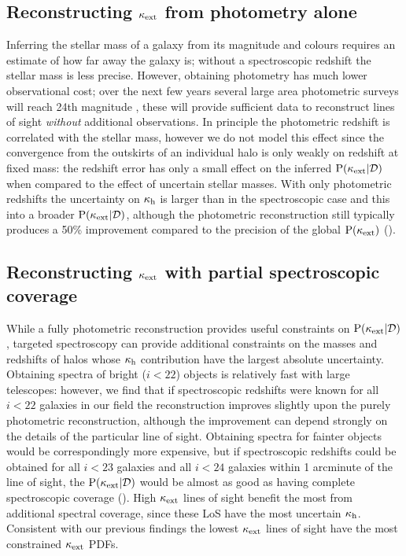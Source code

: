 \documentclass[useAMS,usenatbib]{mn2e}
\begin{document}
%

\subsection{Reconstructing $\kappa_{\rm ext}$ from photometry alone}

Inferring the stellar mass of a galaxy from its magnitude and colours requires
an estimate of how far away the galaxy is; without a spectroscopic redshift
the \infered stellar mass is less precise. However, obtaining photometry has
much lower observational cost; over the next few years several large area
photometric surveys will reach 24th magnitude \citep{Euclid,LSST}, these will
provide sufficient data to reconstruct lines of sight {\it without} additional
observations. In principle the photometric redshift is correlated with the
\infered stellar mass, however we do not model this effect since the
convergence from the outskirts of an individual halo is only weakly \dependant
on redshift at fixed mass: the redshift error has only a small effect on the
inferred ${\rm P}(\kappa_{\rm ext}|{\mathcal{D}})$ when compared to the effect of uncertain stellar
masses.  With only photometric redshifts the uncertainty on
$\kappa_{\rm h}$ is larger than in the spectroscopic case and this
\propogates into a broader ${\rm P}(\kappa_{\rm ext}|{\mathcal{D}})$, although the photometric
reconstruction still typically produces a 50\% improvement compared to the
precision of the global ${\rm P}(\kappa_{\rm ext})$ ().


\subsection{Reconstructing $\kappa_{\rm ext}$ with partial spectroscopic coverage}

While a fully photometric reconstruction provides useful constraints on
${\rm P}(\kappa_{\rm ext}|{\mathcal{D}})$, targeted spectroscopy can provide additional constraints
on the masses and redshifts of halos whose $\kappa_{\rm h}$ contribution have the
largest absolute uncertainty. Obtaining spectra of bright ($i<22$) objects is
relatively fast with large telescopes: however, we find that if spectroscopic
redshifts were known for all $i<22$ galaxies in our field the reconstruction
improves slightly upon the purely photometric reconstruction, although the
improvement can depend strongly on the details of the particular line of
sight. Obtaining spectra for fainter objects would be correspondingly more
expensive, but if spectroscopic redshifts could be obtained for all $i<23$
galaxies and all $i<24$ galaxies within 1 arcminute of the line of sight, the
${\rm P}(\kappa_{\rm ext}|{\mathcal{D}})$ would be almost as good as having complete spectroscopic
coverage (). High $\kappa_{\rm ext}$ lines of sight benefit the
most from additional spectral coverage, since these LoS have the most
uncertain $\kappa_{\rm h}$. Consistent with our previous findings the lowest $\kappa_{\rm ext}$
lines of sight have the most constrained $\kappa_{\rm ext}$ PDFs.
\end{document}
